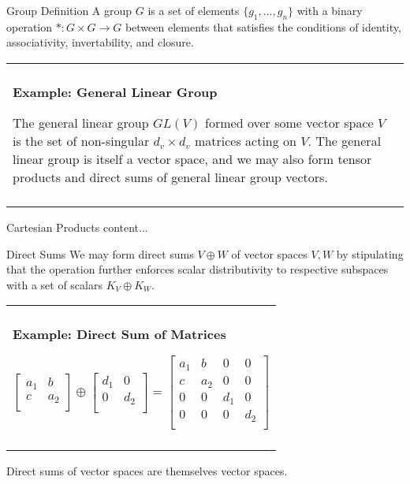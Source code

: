 \documentclass[11pt]{beamer}
\newenvironment{boxed2}
    {\begin{center}
    \begin{tabular}{|p{0.95\textwidth}|}
    \hline\\
    }
    { 
    \\\\\hline
    \end{tabular} 
    \end{center}
    }
\begin{document}
\begin{frame}{Group Definition}
	A group $G$ is a set of elements $\lbrace g_1, ..., g_n\rbrace$ with a binary operation $*:G\times G \rightarrow G$ between elements that satisfies the conditions of identity, associativity, invertability, and closure.
	
	\begin{boxed2}
		
		\vspace{-.5cm}
		
		\textbf{Example: General Linear Group}
		
	The general linear group $GL(V)$ formed over some vector space $V$ is the set of non-singular $d_v\times d_v$ matrices acting on $V$. The general linear group is itself a vector space, and we may also form tensor products and direct sums of general linear group vectors.
	\end{boxed2}
\end{frame}

\begin{frame}{Cartesian Products}
	content...
\end{frame}

\begin{frame}{Direct Sums}
We may form direct sums $V\oplus W$ of vector spaces $V,W$ by stipulating that the operation further enforces scalar distributivity to respective subspaces with a set of scalars $K_V\oplus K_W$.

\begin{boxed2}
	
	\vspace{-.57cm}
	
	\textbf{Example: Direct Sum of Matrices}
	
	
	\vspace{-.12cm}
	
	$$
		\begin{bmatrix}
			a_1&b\\
			c&a_2\\
		\end{bmatrix}
		\oplus 
		\begin{bmatrix}
			d_1&0\\
			0&d_2\\
		\end{bmatrix}
		=\begin{bmatrix}
			a_1&b&0&0\\
			c&a_2&0&0\\
			0&0 &d_1 &0\\
			0&0&0&d_2\\
		\end{bmatrix}
	$$

\vspace{-.3cm}

\end{boxed2}
	
Direct sums of vector spaces are themselves vector spaces.
\end{frame}
\end{document}

